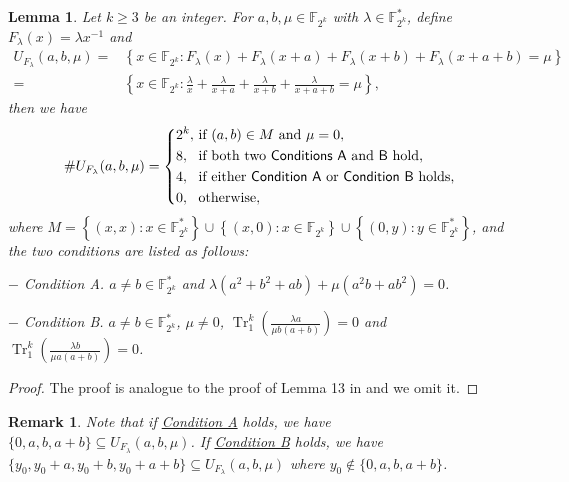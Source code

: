 \documentclass[preprint,10pt]{elsarticle}
\newcommand{\F}{\mathbb{F}}
\newcommand{\0}{\textbf{0}}
\newcommand{\1}{\textbf{1}}
\newcommand{\TRACE}{\operatorname{Tr}_1^k}
\theoremstyle{plain}
\newtheorem{lemma}{Lemma}
\newtheorem{remark}{Remark}
\begin{document}
    \begin{lemma}\label{lemma:num_sol_second_dev}
        Let $k\ge 3$ be an integer.
        For $a,b,\mu\in\F_{2^k}$ with $\lambda\in\F_{2^k}^*$, define $F_{\lambda}(x)=\lambda x^{-1}$ and
        \begin{align*}
            U_{F_{\lambda}}(a,b,\mu)=&\left\{x\in\F_{2^k} : F_{\lambda}(x)+F_{\lambda}(x+a)+F_{\lambda}(x+b)+F_{\lambda}(x+a+b)=\mu\right\}\\
            =&\left\{ x\in\F_{2^k} : \frac{\lambda}{x}+\frac{\lambda}{x+a}+\frac{\lambda}{x+b}+\frac{\lambda}{x+a+b}=\mu \right\},
        \end{align*}
        then we have
        \[\# U_{F_{\lambda}}(a,b,\mu) = \left\{
            \begin{alignedat}{2}
                &2^k,&&\text{ if }(a,b)\in M\text{ and }\mu = 0,\\
                &8,&&\text{ if both two \textsf{Conditions~A}}\text{ and~\textsf{B}}\text{ hold,}\\
                &4,&&\text{ if either \textsf{Condition~A}}\text{ or~\textsf{Condition B}} \text{ holds,}\\
                &0,&&\text{ otherwise},
            \end{alignedat}\right.\]
        where $M=\left\{ (x,x):x\in\F_{2^k}^* \right\}\cup\left\{ (x,0):x\in\F_{2^k} \right\}\cup\left\{ (0,y):y\in\F_{2^k}^* \right\}$, and the two conditions are listed as follows:

        \noindent $-$  \textsf{Condition A}. $a\ne b\in\F_{2^k}^*$ and $\lambda(a^2+b^2+ab)+\mu(a^2b+ab^2)=0$.\label{item_a}

        \noindent $-$  \textsf{Condition B}. $a\ne b\in\F_{2^k}^*$, $\mu\ne 0$, $\TRACE\left(\frac{\lambda a}{\mu b(a+b)}\right)=0$ and $\TRACE\left(\frac{\lambda b}{\mu a(a+b)}\right)=0$.\label{item_b}

    \end{lemma}
    \begin{proof}
        The proof is analogue to the proof of Lemma 13 in \cite{TangMM2022inversefunction} and we omit it.
    \end{proof}
    \begin{remark}
        Note that if \hyperref[item_a]{\textsf{Condition A}} holds, we have $\{0,a,b,a+b\}\subseteq U_{F_{\lambda} }(a,b,\mu)$.
        If \hyperref[item_b]{\textsf{Condition B}} holds, we have $\{y_0,y_0+a,y_0+b,y_0+a+b\}\subseteq U_{F_{\lambda}}(a,b,\mu)$ where $y_0\notin\{0,a,b,a+b\}$.
    \end{remark}
\end{document}
